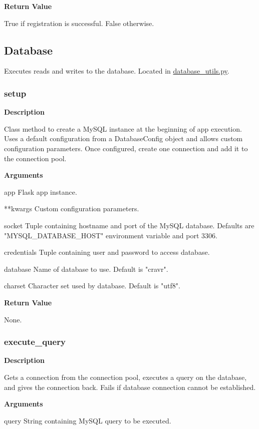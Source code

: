 \documentclass[11pt]{article}
\begin{document}
\textbf{Return Value}

True if registration is successful. False otherwise.


\subsection{Database}
Executes reads and writes to the database. Located in \url{database\_utils.py}.

\subsubsection{setup}
\textbf{Description}

Class method to create a MySQL instance at the beginning of app execution. Uses a default configuration from a DatabaseConfig object and allows custom configuration parameters. Once configured, create one connection and add it to the connection pool.

\textbf{Arguments}
\begin{deflist}
	\item[app]Flask app instance.
	\item[**kwargs]Custom configuration parameters.
	\begin{deflist}
		\item[socket]Tuple containing hostname and port of the MySQL database. Defaults are 
					 "MYSQL\_DATABASE\_HOST" environment variable and port 3306.
		\item[credentials]Tuple containing user and password to access database.
		\item[database]Name of database to use. Default is "cravr".
		\item[charset]Character set used by database. Default is "utf8".
	\end{deflist}
\end{deflist}

\textbf{Return Value}

None.

\subsubsection{execute\_query}
\textbf{Description}

Gets a connection from the connection pool, executes a query on the database, and gives the connection back. Fails if database connection cannot be established.

\textbf{Arguments}
\begin{deflist}
	\item[query]String containing MySQL query to be executed.
\end{deflist}
\end{document}

